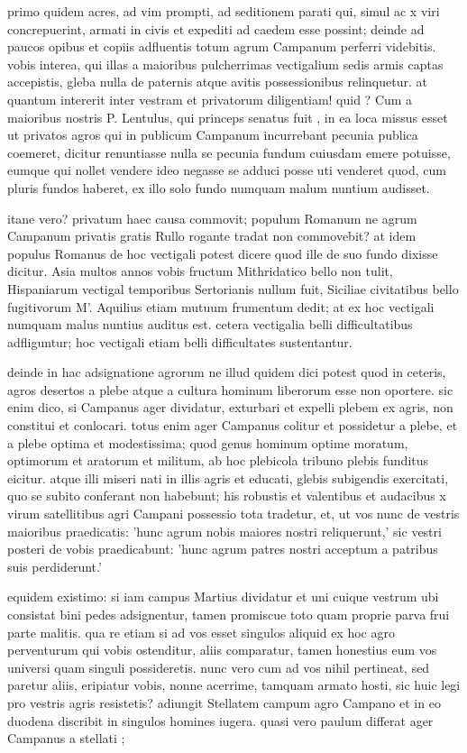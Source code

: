  primo quidem acres, ad vim prompti, ad seditionem parati qui, simul ac x viri concrepuerint, armati in civis et expediti ad caedem esse possint; deinde ad paucos opibus et copiis adfluentis totum agrum Campanum perferri videbitis. vobis interea, qui illas a maioribus pulcherrimas vectigalium sedis armis captas accepistis, gleba nulla de paternis atque avitis possessionibus relinquetur. at quantum intererit inter vestram et privatorum diligentiam! quid ? Cum a maioribus nostris P. Lentulus, qui princeps senatus fuit , in ea loca missus esset ut privatos agros qui in publicum Campanum incurrebant pecunia publica coemeret, dicitur renuntiasse nulla se pecunia fundum cuiusdam emere potuisse, eumque qui nollet vendere ideo negasse se adduci posse uti venderet quod, cum pluris fundos haberet, ex illo solo fundo numquam malum nuntium audisset.

 itane vero? privatum haec causa commovit; populum Romanum ne agrum Campanum privatis gratis Rullo rogante tradat non commovebit? at idem populus Romanus de hoc vectigali potest dicere quod ille de suo fundo dixisse dicitur. Asia multos annos vobis fructum Mithridatico bello non tulit, Hispaniarum vectigal temporibus Sertorianis nullum fuit, Siciliae civitatibus bello fugitivorum M'. Aquilius etiam mutuum frumentum dedit; at ex hoc vectigali numquam malus nuntius auditus est. cetera vectigalia belli difficultatibus adfliguntur; hoc vectigali etiam belli difficultates sustentantur.

 deinde in hac adsignatione agrorum ne illud quidem dici potest quod in ceteris, agros desertos a plebe atque a cultura hominum liberorum esse non oportere. sic enim dico, si Campanus ager dividatur, exturbari et expelli plebem ex agris, non constitui et conlocari. totus enim ager Campanus colitur et possidetur a plebe, et a plebe optima et modestissima; quod genus hominum optime moratum, optimorum et aratorum et militum, ab hoc plebicola tribuno plebis funditus eicitur. atque illi miseri nati in illis agris et educati, glebis subigendis exercitati, quo se subito conferant non habebunt; his robustis et valentibus et audacibus x virum satellitibus agri Campani possessio tota tradetur, et, ut vos nunc de vestris maioribus praedicatis: 'hunc agrum nobis maiores nostri reliquerunt,' sic vestri posteri de vobis praedicabunt: 'hunc agrum patres nostri acceptum a patribus suis perdiderunt.'

 equidem existimo: si iam campus Martius dividatur et uni cuique vestrum ubi consistat bini pedes adsignentur, tamen promiscue toto quam proprie parva frui parte malitis. qua re etiam si ad vos esset singulos aliquid ex hoc agro perventurum qui vobis ostenditur, aliis comparatur, tamen honestius eum vos universi quam singuli possideretis. nunc vero cum ad vos nihil pertineat, sed paretur aliis, eripiatur vobis, nonne acerrime, tamquam armato hosti, sic huic legi pro vestris agris resistetis? adiungit Stellatem campum agro Campano et in eo duodena discribit in singulos homines iugera. quasi vero paulum differat ager Campanus a stellati ;

